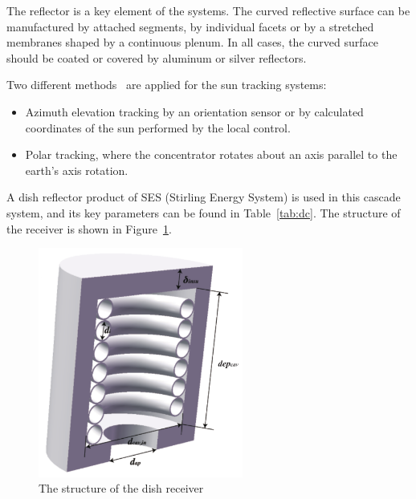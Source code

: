 The reflector is a key element of the systems. The curved reflective surface can be manufactured by attached segments, by individual facets or by a stretched membranes shaped by a continuous plenum. In all cases, the curved surface should be coated or covered by aluminum or silver reflectors. 

Two different methods~\cite{Adkins1987} are applied for the sun tracking systems:
\begin{itemize}
  \item Azimuth elevation tracking by an orientation sensor or by calculated coordinates of the sun performed by the local control.
  \item Polar tracking, where the concentrator rotates about an axis parallel to the earth’s axis rotation.
\end{itemize}

A dish reflector product of SES (Stirling Energy System) is used in this cascade system, and its key parameters can be found in Table~\ref{tab:dc}. The structure of the receiver is shown in Figure~\ref{fig:dishReceiver}.

\begin{figure}[!ht]
\centering
\includegraphics[width=0.6\textwidth]{fig/DishReceiver.pdf}
\caption{The structure of the dish receiver}\label{fig:dishReceiver}
\end{figure}

